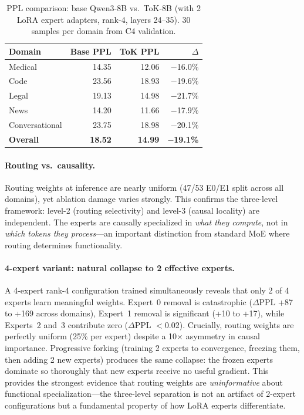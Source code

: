 \documentclass{article}
\begin{document}
\begin{table}[h]
\centering
\caption{PPL comparison: base Qwen3-8B vs.\ ToK-8B (with 2 LoRA expert
adapters, rank-4, layers 24--35). 30 samples per domain from C4 validation.}
\label{tab:8b-quality}
\begin{tabular}{@{}lrrr@{}}
\toprule
Domain & Base PPL & ToK PPL & $\Delta$ \\
\midrule
Medical       & 14.35 & 12.06 & $-$16.0\% \\
Code          & 23.56 & 18.93 & $-$19.6\% \\
Legal         & 19.13 & 14.98 & $-$21.7\% \\
News          & 14.20 & 11.66 & $-$17.9\% \\
Conversational& 23.75 & 18.98 & $-$20.1\% \\
\midrule
\textbf{Overall} & \textbf{18.52} & \textbf{14.99} & $-$\textbf{19.1\%} \\
\bottomrule
\end{tabular}
\end{table}

\paragraph{Routing vs.\ causality.}
Routing weights at inference are nearly uniform (47/53 E0/E1 split across all
domains), yet ablation damage varies strongly. This confirms the three-level
framework: level-2 (routing selectivity) and level-3 (causal locality) are
independent. The experts are causally specialized in \emph{what they compute},
not in \emph{which tokens they process}---an important distinction from
standard MoE where routing determines functionality.

\paragraph{4-expert variant: natural collapse to 2 effective experts.}
A 4-expert rank-4 configuration trained simultaneously reveals that only 2 of 4
experts learn meaningful weights. Expert~0 removal is catastrophic
($\Delta$PPL +87 to +169 across domains), Expert~1 removal is significant
(+10 to +17), while Experts~2 and~3 contribute zero ($\Delta$PPL $<$0.02).
Crucially, routing weights are perfectly uniform (25\% per expert) despite
a 10$\times$ asymmetry in causal importance. Progressive forking (training 2
experts to convergence, freezing them, then adding 2 new experts) produces
the same collapse: the frozen experts dominate so thoroughly that new experts
receive no useful gradient. This provides the strongest evidence that routing
weights are \emph{uninformative} about functional specialization---the
three-level separation is not an artifact of 2-expert configurations but a
fundamental property of how LoRA experts differentiate.
\end{document}
